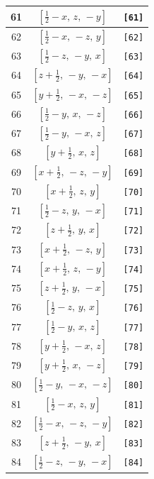 \documentclass[fleqn,8pt]{jsarticle}
\begin{document}
\begin{longtable}{ccc}
61 & $\left[ \frac{1}{2} - x,\, z,\, - y \right]$ & {\tt [61]} \\ \hline
62 & $\left[ \frac{1}{2} - x,\, - z,\, y \right]$ & {\tt [62]} \\ \hline
63 & $\left[ \frac{1}{2} - z,\, - y,\, x \right]$ & {\tt [63]} \\ \hline
64 & $\left[ z + \frac{1}{2},\, - y,\, - x \right]$ & {\tt [64]} \\ \hline
65 & $\left[ y + \frac{1}{2},\, - x,\, - z \right]$ & {\tt [65]} \\ \hline
66 & $\left[ \frac{1}{2} - y,\, x,\, - z \right]$ & {\tt [66]} \\ \hline
67 & $\left[ \frac{1}{2} - y,\, - x,\, z \right]$ & {\tt [67]} \\ \hline
68 & $\left[ y + \frac{1}{2},\, x,\, z \right]$ & {\tt [68]} \\ \hline
69 & $\left[ x + \frac{1}{2},\, - z,\, - y \right]$ & {\tt [69]} \\ \hline
70 & $\left[ x + \frac{1}{2},\, z,\, y \right]$ & {\tt [70]} \\ \hline
71 & $\left[ \frac{1}{2} - z,\, y,\, - x \right]$ & {\tt [71]} \\ \hline
72 & $\left[ z + \frac{1}{2},\, y,\, x \right]$ & {\tt [72]} \\ \hline
73 & $\left[ x + \frac{1}{2},\, - z,\, y \right]$ & {\tt [73]} \\ \hline
74 & $\left[ x + \frac{1}{2},\, z,\, - y \right]$ & {\tt [74]} \\ \hline
75 & $\left[ z + \frac{1}{2},\, y,\, - x \right]$ & {\tt [75]} \\ \hline
76 & $\left[ \frac{1}{2} - z,\, y,\, x \right]$ & {\tt [76]} \\ \hline
77 & $\left[ \frac{1}{2} - y,\, x,\, z \right]$ & {\tt [77]} \\ \hline
78 & $\left[ y + \frac{1}{2},\, - x,\, z \right]$ & {\tt [78]} \\ \hline
79 & $\left[ y + \frac{1}{2},\, x,\, - z \right]$ & {\tt [79]} \\ \hline
80 & $\left[ \frac{1}{2} - y,\, - x,\, - z \right]$ & {\tt [80]} \\ \hline
81 & $\left[ \frac{1}{2} - x,\, z,\, y \right]$ & {\tt [81]} \\ \hline
82 & $\left[ \frac{1}{2} - x,\, - z,\, - y \right]$ & {\tt [82]} \\ \hline
83 & $\left[ z + \frac{1}{2},\, - y,\, x \right]$ & {\tt [83]} \\ \hline
84 & $\left[ \frac{1}{2} - z,\, - y,\, - x \right]$ & {\tt [84]} \\ \hline

\end{longtable}
\end{document}
